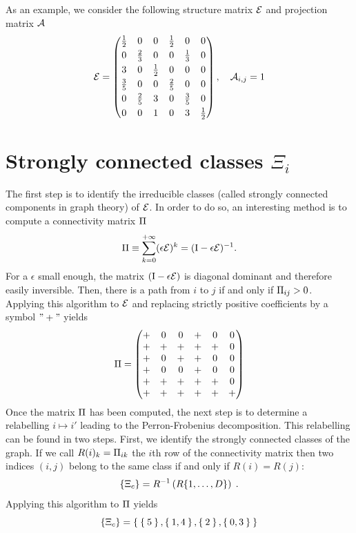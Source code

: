\documentclass{article}
\begin{document}
 
As an example, we consider the following structure matrix $\mathcal{E}$ and projection matrix $\mathcal{A}$
%
\begin{equation}
\mathcal{E} = \begin{pmatrix}
\frac{1}{2}& 0& 0& \frac{1}{2}& 0& 0\\[0.1cm]
0& \frac{2}{3}& 0& 0& \frac{1}{3}& 0\\[0.1cm]
3& 0& \frac{1}{2}& 0& 0& 0\\[0.1cm]
\frac{3}{5}& 0& 0& \frac{2}{5}& 0& 0\\[0.1cm]
0& \frac{2}{5}& 3& 0& \frac{3}{5}& 0\\[0.1cm]
0& 0& 1& 0& 3& \frac{1}{2}
\end{pmatrix}, \quad \mathcal{A}_{i,j} = 1   
\end{equation}

 
\section{Strongly connected classes $\Xi_i$}
The first step is to identify the irreducible classes (called strongly connected components in graph theory) of $\mathcal{E}$.
In order to do so, an interesting method is to compute a connectivity matrix $\Pi$
\begin{equation} 
\Pi \equiv \sum_{k=0}^{+\infty} (\epsilon\mathcal{E})^k = (\mathrm I- \epsilon\mathcal{E} )^{-1} .
\end{equation}
For a $\epsilon$ small enough, the matrix $(\mathrm I- \epsilon \mathcal{E} )$ is diagonal dominant
and therefore easily inversible.
Then, there is a path from $i$ to $j$ if and only if $ \Pi_{ij} >0$.
Applying this algorithm to $\mathcal{E}$ and replacing strictly positive coefficients by a symbol $"+"$ yields 
\begin{equation}
%
\ex\Conn = \begin{pmatrix}
+& 0& 0& +& 0& 0\\
+& +& +& +& +& 0\\
+& 0& +& +& 0& 0\\
+& 0& 0& +& 0& 0\\
+& +& +& +& +& 0\\
+& +& +& +& +& +
\end{pmatrix} 
\end{equation}
Once the matrix $\Pi$ has been computed, the next step is to determine a relabelling $i \mapsto i'$
leading to the Perron-Frobenius decomposition.
This relabelling can be found in two steps. First, we identify the strongly connected classes of the graph.
If we call $R(i)_k = \Pi_{ik}$ the $i$th row of the connectivity matrix then two indices $(i,j)$ belong to
the same class if and only if $R(i)=R(j)$:
\begin{equation}
 \{ \Xi_{c} \} =  R^{-1}\left( R \{ 1, \dots, D \} \right) \;.
\end{equation}
Applying this algorithm to $\Pi$ yields
% 
\begin{equation} %
\{ \ex{\sC{c}} \} =  \Set{\Set{5},\Set{1,4},\Set{2},\Set{0,3}} 
\end{equation}
\end{document}
